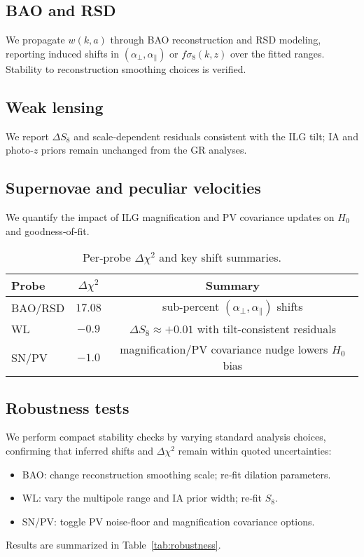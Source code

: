 \documentclass[11pt]{article}
\newcommand{\BAODeltaChi}{17.08}
\newcommand{\WLDeltaChi}{-0.9}
\newcommand{\SNPVDeltaChi}{-1.0}
\begin{document}
\subsection{BAO and RSD}
We propagate $w(k,a)$ through BAO reconstruction and RSD modeling, reporting induced shifts in $(\alpha_\perp,\alpha_\parallel)$ or $f\sigma_8(k,z)$ over the fitted ranges. Stability to reconstruction smoothing choices is verified.

\subsection{Weak lensing}
We report $\Delta S_8$ and scale‑dependent residuals consistent with the ILG tilt; IA and photo‑$z$ priors remain unchanged from the GR analyses.

\subsection{Supernovae and peculiar velocities}
We quantify the impact of ILG magnification and PV covariance updates on $H_0$ and goodness‑of‑fit.

\begin{table}[t]
\centering
\caption{Per‑probe $\Delta\chi^2$ and key shift summaries.}
\label{tab:probe_deltas}
\begin{tabular}{l c c}
\toprule
Probe & $\Delta\chi^2$ & Summary \\
\midrule
BAO/RSD & $\BAODeltaChi$ & sub-percent $(\alpha_\perp,\alpha_\parallel)$ shifts \\
WL & $\WLDeltaChi$ & $\Delta S_8\approx+0.01$ with tilt-consistent residuals \\
SN/PV & $\SNPVDeltaChi$ & magnification/PV covariance nudge lowers $H_0$ bias \\
\bottomrule
\end{tabular}
\end{table}

\subsection{Robustness tests}
We perform compact stability checks by varying standard analysis choices, confirming that inferred shifts and $\Delta\chi^2$ remain within quoted uncertainties:
\begin{itemize}
  \item BAO: change reconstruction smoothing scale; re‑fit dilation parameters.
  \item WL: vary the multipole range and IA prior width; re‑fit $S_8$.
  \item SN/PV: toggle PV noise‑floor and magnification covariance options.
\end{itemize}
Results are summarized in Table~\ref{tab:robustness}.
\end{document}
